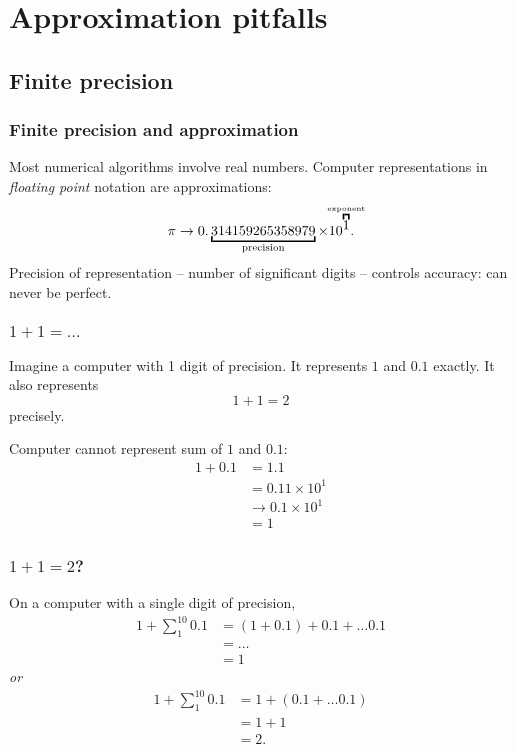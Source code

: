 \documentclass{beamer}
\begin{document}
\section{Approximation pitfalls}


\subsection{Finite precision}


\begin{frame}
  \frametitle{Finite precision and approximation}

  Most numerical algorithms involve real numbers. Computer
  representations in \emph{floating point} notation are
  approximations:
  \begin{equation*}
    \pi \rightarrow 0.\underbracket{314159265358979}_{\text{precision}} \times 10^{\overbracket{1}^{\text{\clap{exponent}}}}.
  \end{equation*}
  Precision of representation -- number of significant
  digits -- controls accuracy: can never be perfect.

\end{frame}


\begin{frame}
  \frametitle{$1 + 1 = \dots$}

  Imagine a computer with 1 digit of precision. It
  represents $1$ and $0.1$ exactly. It also represents
  \begin{equation*}
    1 + 1 = 2
  \end{equation*}
  precisely. \pause

  Computer cannot represent sum of $1$ and $0.1$:
  \begin{align*}
    1 + 0.1 & = 1.1 \\
            & = 0.11 \times 10^1 \\
            & \rightarrow 0.1 \times 10^1 \\
            & = 1
  \end{align*}

\end{frame}


\begin{frame}
  \frametitle{$1 + 1 = 2$?}

  On a computer with a single digit of precision,
  \begin{align*}
    1 + \sum_1^{10} 0.1 & = (1 + 0.1) + 0.1 + \dots 0.1 \\
                        & = \dots \\
                        & = 1
  \end{align*} \pause
  \emph{or}
  \begin{align*}
    1 + \sum_1^{10} 0.1 & = 1 + (0.1 + \dots 0.1) \\
                        & = 1 + 1 \\
                        & = 2.
  \end{align*}

\end{frame}
\end{document}
